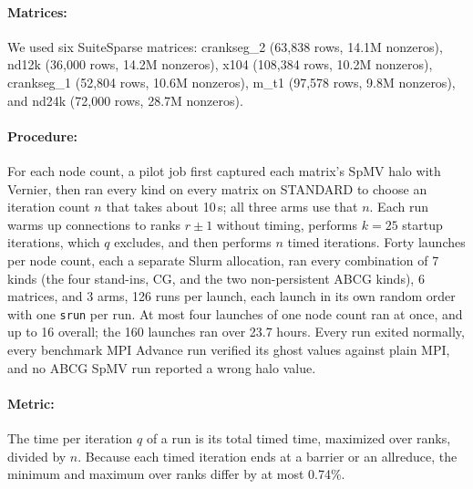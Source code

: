 \documentclass[11pt]{article}
\begin{document}
\paragraph{Matrices:} We used six SuiteSparse matrices: crankseg\_2 (63,838 rows,
14.1M nonzeros), nd12k (36,000 rows, 14.2M nonzeros), x104 (108,384 rows, 10.2M
nonzeros), crankseg\_1 (52,804 rows, 10.6M nonzeros), m\_t1 (97,578 rows, 9.8M
nonzeros), and nd24k (72,000 rows, 28.7M nonzeros).

\paragraph{Procedure:} For each node count, a pilot job first captured each matrix's
SpMV halo with Vernier, then ran every kind on every matrix on STANDARD to choose an
iteration count $n$ that takes about 10\,s; all three arms use that $n$. Each run warms
up connections to ranks $r\pm1$ without timing, performs $k=25$ startup iterations,
which $q$ excludes, and then performs $n$ timed iterations. Forty launches per node
count, each a separate Slurm allocation, ran every combination of 7 kinds (the four
stand-ins, CG, and the two non-persistent ABCG kinds), 6 matrices, and 3 arms, 126 runs
per launch, each launch in its own random order with one \texttt{srun} per run. At most
four launches of one node count ran at once, and up to 16 overall; the 160 launches ran
over 23.7 hours. Every run exited normally, every benchmark MPI Advance run verified its
ghost values against plain MPI, and no ABCG SpMV run reported a wrong halo value.

\paragraph{Metric:} The time per iteration $q$ of a run is its total timed time,
maximized over ranks, divided by $n$. Because each timed iteration ends at a barrier or
an allreduce, the minimum and maximum over ranks differ by at most 0.74\%.
\end{document}

